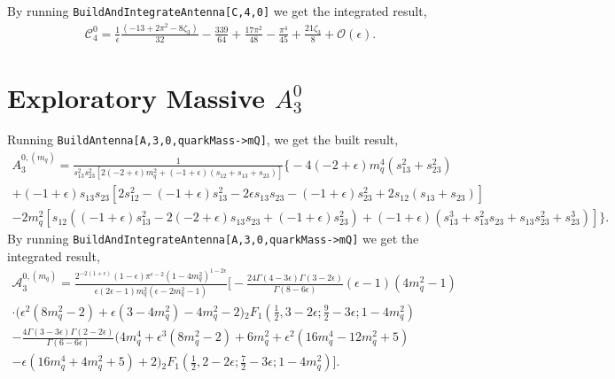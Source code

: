 By running \texttt{BuildAndIntegrateAntenna[C,4,0]} we get the integrated result, 
\begin{equation}
    \begin{gathered}
        \mathcal C_4^0 = \frac1\epsilon\frac{\left(-13+2\pi^2-8\zeta_3\right)}{32} - \frac{339}{64} + \frac{17\pi^2}{48} - \frac{\pi^4}{45} + \frac{21\zeta_3}{8} + \mathcal O(\epsilon).
    \end{gathered}
\end{equation}

\section{Exploratory Massive \texorpdfstring{$A_3^0$}{A30}}

Running \texttt{BuildAntenna[A,3,0,quarkMass->mQ]}, we get the built result,
\begin{gather}
    A_3^{0, (m_q)} = \frac{1}{s_{13}^2s_{23}^2\left[2(-2+\epsilon)m_q^2+(-1+\epsilon)(s_{12}+s_{13}+s_{23})\right]}\Big\{-4(-2+\epsilon)m_q^4\left(s_{13}^2+s_{23}^2\right) \nonumber \\
    +(-1+\epsilon)s_{13}s_{23}\left[2s_{12}^2-(-1+\epsilon)s_{13}^2-2\epsilon s_{13}s_{23}-(-1+\epsilon)s_{23}^2+2s_{12}(s_{13}+s_{23})\right] \nonumber \\
    -2m_q^2\left[s_{12}\left((-1+\epsilon)s_{13}^2-2(-2+\epsilon)s_{13}s_{23}+(-1+\epsilon)s_{23}^2\right)+(-1+\epsilon)\left(s_{13}^3+s_{13}^2s_{23}+s_{13}s_{23}^2+s_{23}^3\right)\right]\Big\}.
\end{gather}
By running \texttt{BuildAndIntegrateAntenna[A,3,0,quarkMass->mQ]} we get the integrated result, 
\begin{gather}
    \mathcal A_3^{0, (m_q)} = \frac{2^{-2(1+\epsilon)}(1-\epsilon)\pi^{\epsilon-2}\!\left(1-4m_q^2\right)^{1-2\epsilon}}{\epsilon(2\epsilon-1)m_q^2\!\left(\epsilon-2m_q^2-1\right)}\Bigg[-\frac{24\Gamma(4-3\epsilon)\Gamma(3-2\epsilon)}{\Gamma(8-6\epsilon)}(\epsilon-1)\!\left(4m_q^2-1\right) \nonumber \\
    \cdot\bigg(\epsilon^2\left(8m_q^2-2\right)+\epsilon\left(3-4m_q^2\right)-4m_q^2-2\bigg){}_2F_1\!\left(\frac12,3-2\epsilon;\frac92-3\epsilon;1-4m_q^2\right) \nonumber \\
    -\frac{4\Gamma(3-3\epsilon)\Gamma(2-2\epsilon)}{\Gamma(6-6\epsilon)}\bigg(4m_q^4+\epsilon^3\left(8m_q^2-2\right)+6m_q^2+\epsilon^2\left(16m_q^4-12m_q^2+5\right) \nonumber \\
    -\epsilon\left(16m_q^4+4m_q^2+5\right)+2\bigg){}_2F_1\!\left(\frac12,2-2\epsilon;\frac72-3\epsilon;1-4m_q^2\right)\Bigg].
\end{gather}
